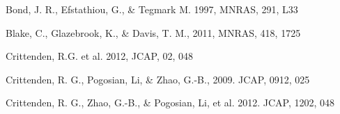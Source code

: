 \documentclass[twocolumn]{aastex61}
\begin{document}
\begin{thebibliography}{}
Bond, J. R., Efstathiou, G., \& Tegmark M. 1997, MNRAS, 291, L33

Blake, C., Glazebrook, K., \& Davis, T. M., 2011, MNRAS, 418, 1725  










Crittenden, R.G. et al. 2012, JCAP, 02, 048






Crittenden, R. G., Pogosian, Li, \& Zhao, G.-B., 2009. JCAP, 0912, 025

Crittenden, R. G., Zhao, G.-B., \& Pogosian, Li, et al. 2012. JCAP, 1202, 048






\end{thebibliography}
\end{document}

